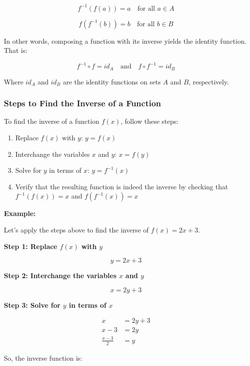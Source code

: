 \[
	f^{-1}(f(a)) = a \quad \text{for all } a \in A
\]

\[
	f(f^{-1}(b)) = b \quad \text{for all } b \in B
\]

In other words, composing a function with its inverse yields the identity function. That is:

\[
	f^{-1} \circ f = id_A \quad \text{and} \quad f \circ f^{-1} = id_B
\]

Where \(id_A\) and \(id_B\) are the identity functions on sets \(A\) and \(B\), respectively.

\subsubsection{Steps to Find the Inverse of a Function}

To find the inverse of a function \(f (x)\), follow these steps:

\begin{enumerate}
	\item Replace \(f (x)\) with \(y\): \(y = f (x)\)
	\item Interchange the variables \(x\) and \(y\): \(x = f (y)\)
	\item Solve for \(y\) in terms of \(x\): \(y = f^{-1} (x)\)
	\item Verify that the resulting function is indeed the inverse by checking that \(f^{-1}(f(x)) = x\) and \(f (f^{-1} (x)) = x\)
\end{enumerate}

\textbf{Example:}
\vspace{\baselineskip}

Let's apply the steps above to find the inverse of \(f (x) = 2x + 3\).
\vspace{\baselineskip}

\textbf{Step 1: Replace \(f (x)\) with \(y\)}

\[
	y = 2x + 3
\]

\textbf{Step 2: Interchange the variables \(x\) and \(y\)}

\[
	x = 2y + 3
\]

\textbf{Step 3: Solve for \(y\) in terms of \(x\)}

\begin{align*}
	x               & = 2y + 3 \\
	x - 3           & = 2y     \\
	\frac{x - 3}{2} & = y
\end{align*}

So, the inverse function is:

